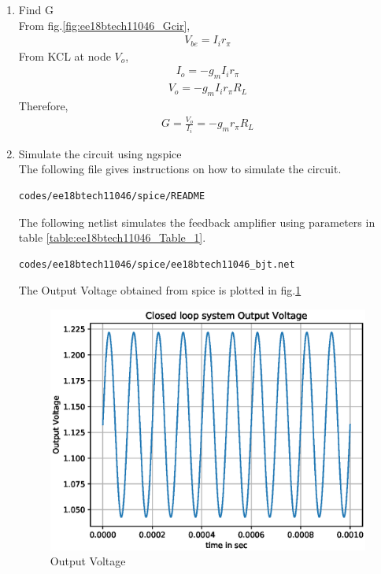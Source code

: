 \begin{enumerate}[label=\thesection.\arabic*.,ref=\thesection.\theenumi]
\item Find G
\\
\solution
From fig.\ref{fig:ee18btech11046_Gcir},
\begin{align}
V_{be} = I_{i}r_{\pi}
\end{align}
From KCL at node $V_{o}$,
\begin{align}
I_{o} = -g_{m}I_{i}r_{\pi}
\end{align}
\begin{align}
V_{o} = -g_{m}I_{i}r_{\pi}R_{L}
\end{align}
Therefore,
\begin{align}
G =\frac{V_{o}}{I_{i}} = -g_{m}r_{\pi}R_{L}
\end{align}

\item Simulate the circuit using ngspice
\\
\solution
The following file gives instructions on how to simulate the circuit.
\begin{lstlisting}
codes/ee18btech11046/spice/README
\end{lstlisting}

The following netlist simulates the feedback amplifier using parameters in table \ref{table:ee18btech11046_Table_1}.
\begin{lstlisting}
codes/ee18btech11046/spice/ee18btech11046_bjt.net
\end{lstlisting}

The Output Voltage obtained from spice is plotted in fig.\ref{fig:ee18btech11046_spice}
%
\begin{figure}[!ht]
\centering
\includegraphics[width=\columnwidth]{./figs/ee18btech11046/ee18btech11046.eps}
\caption{Output Voltage}
\label{fig:ee18btech11046_spice}
\end{figure}
%


\end{enumerate}
